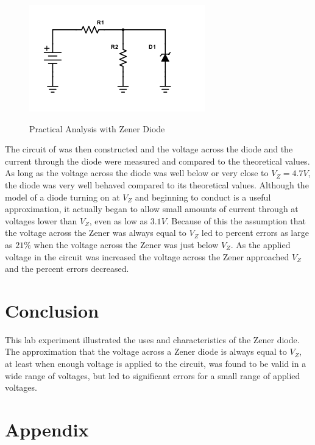 \documentclass{amsart}
\begin{document}
\begin{figure}[H]
\caption{Practical Analysis with Zener Diode}
\includegraphics[width=\textwidth]{L2F2.png}
\label{fig:practical}
\end{figure}

The circuit of  was then constructed and 
the voltage across the diode and the current through the diode were measured and compared to the theoretical values.  As long as the voltage across the diode was well below or very close to $V_Z=4.7V$, the diode was very well behaved compared to its theoretical values. Although the model of a diode turning on at $V_Z$ and beginning to conduct is a useful approximation, it actually began to allow small amounts of current through at voltages lower than $V_Z$, even as low as $3.1V$.  Because of this the assumption that the voltage across the Zener was always equal to $V_Z$ led to percent errors as large as $21\%$ when the voltage across the Zener was just below $V_Z$.  As the applied voltage in the circuit was increased the voltage across the Zener approached $V_Z$ and the percent errors decreased.  

\section*{Conclusion}
This lab experiment illustrated the uses and characteristics of the Zener diode.  The approximation that the voltage across a Zener diode is always equal to $V_Z$, at least when enough voltage is applied to the circuit, was found to be valid in a wide range of voltages, but led to significant errors for a small range of applied voltages.  


\section*{Appendix}
\end{document}
